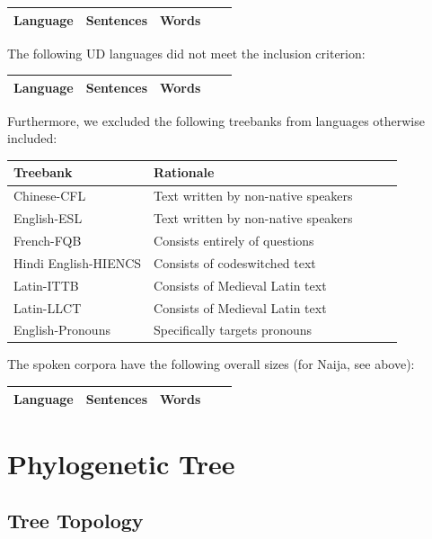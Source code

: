 \documentclass[11pt,a4paper]{article}
\begin{document}
\begin{longtable}{lllll}
Language & Sentences & Words \\ \hline

\end{longtable}

The following UD languages did not meet the inclusion criterion:

\begin{longtable}{lllll}
Language & Sentences & Words \\ \hline

\end{longtable}


Furthermore, we excluded the following treebanks from languages otherwise included:

\begin{tabular}{lllll}
Treebank & Rationale \\ \hline
Chinese-CFL & Text written by non-native speakers\\
English-ESL & Text written by non-native speakers \\
French-FQB & Consists entirely of questions \\
Hindi English-HIENCS &  Consists of codeswitched text \\
Latin-ITTB & Consists of Medieval Latin text \\
Latin-LLCT & Consists of Medieval Latin text  \\
English-Pronouns & Specifically targets pronouns \\
\end{tabular}



The spoken corpora have the following overall sizes (for Naija, see above):

\begin{longtable}{lllll}
Language & Sentences & Words \\ \hline



\end{longtable}

\section{Phylogenetic Tree}

\subsection{Tree Topology}
\end{document}
